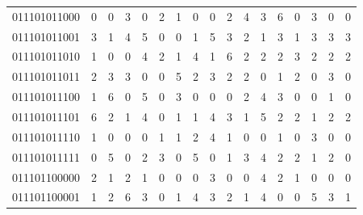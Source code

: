 \documentclass[10pt,a4paper]{article}
\begin{document}
\begin{longtable}{ |c|c|c|c|c|c|c|c|c|c|c|c|c|c|c|c|c| }
    011101011000              & 0                            & 0                                & 3                            & 0                              & 2   & 1   & 0   & 0   & 2   & 4   & 3   & 6   & 0   & 3   & 0   & 0   \\
    011101011001              & 3                            & 1                                & 4                            & 5                              & 0   & 0   & 1   & 5   & 3   & 2   & 1   & 3   & 1   & 3   & 3   & 3   \\
    011101011010              & 1                            & 0                                & 0                            & 4                              & 2   & 1   & 4   & 1   & 6   & 2   & 2   & 2   & 3   & 2   & 2   & 2   \\
    011101011011              & 2                            & 3                                & 3                            & 0                              & 0   & 5   & 2   & 3   & 2   & 2   & 0   & 1   & 2   & 0   & 3   & 0   \\
    011101011100              & 1                            & 6                                & 0                            & 5                              & 0   & 3   & 0   & 0   & 0   & 2   & 4   & 3   & 0   & 0   & 1   & 0   \\
    011101011101              & 6                            & 2                                & 1                            & 4                              & 0   & 1   & 1   & 4   & 3   & 1   & 5   & 2   & 2   & 1   & 2   & 2   \\
    011101011110              & 1                            & 0                                & 0                            & 0                              & 1   & 1   & 2   & 4   & 1   & 0   & 0   & 1   & 0   & 3   & 0   & 0   \\
    011101011111              & 0                            & 5                                & 0                            & 2                              & 3   & 0   & 5   & 0   & 1   & 3   & 4   & 2   & 2   & 1   & 2   & 0   \\
    011101100000              & 2                            & 1                                & 2                            & 1                              & 0   & 0   & 0   & 3   & 0   & 0   & 4   & 2   & 1   & 0   & 0   & 0   \\
    011101100001              & 1                            & 2                                & 6                            & 3                              & 0   & 1   & 4   & 3   & 2   & 1   & 4   & 0   & 0   & 5   & 3   & 1   \\

\end{longtable}
\end{document}
